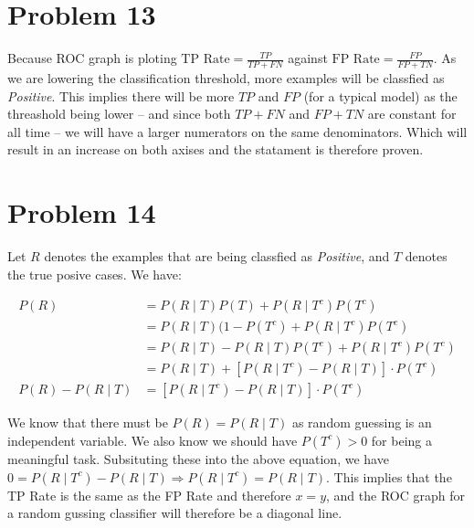 \documentclass[12pt]{article}
\begin{document}
\section{Problem 13}

Because ROC graph is ploting $\text{TP Rate} = \frac{TP}{TP + FN}$ against $\text{FP Rate} = \frac{FP}{FP + TN}$. As we are lowering the classification threshold, more examples will be classfied as \textit{Positive}. This implies there will be more $TP$ and $FP$ (for a typical model) as the threashold being lower -- and since both $TP + FN$ and $FP + TN$ are constant for all time -- we will have a larger numerators on the same denominators. Which will result in an increase on both axises and the statament is therefore proven.

\section{Problem 14}

Let $R$ denotes the examples that are being classfied as \textit{Positive}, and $T$ denotes the true posive cases. We have:

\begin{align*}
    P(R) &= P(R \mid T)P(T) + P(R \mid T^c) P(T^c) \\
    &= P(R \mid T)(1 - P(T^c) + P(R \mid T^c) P(T^c) \\
    &= P(R \mid T) - P(R \mid T)P(T^c)+ P(R \mid T^c) P(T^c) \\
    &= P(R \mid T) + [P(R \mid T^c) -  P(R \mid T)] \cdot P(T^c) \\
    P(R) - P(R \mid T) &= [P(R \mid T^c) -  P(R \mid T)] \cdot P(T^c)
\end{align*}

We know that there must be $P(R) = P(R \mid T)$ as random guessing is an independent variable. We also know we should have $P(T^c) > 0$ for being a meaningful task. Subsituting these into the above equation, we have $0 = P(R \mid T^c) -  P(R \mid T) \Longrightarrow  P(R \mid T^c) = P(R \mid T)$. This implies that the TP Rate is the same as the FP Rate and therefore $x = y$, and the ROC graph for a random gussing classifier will therefore be a diagonal line.


% 
% 
\end{document}
